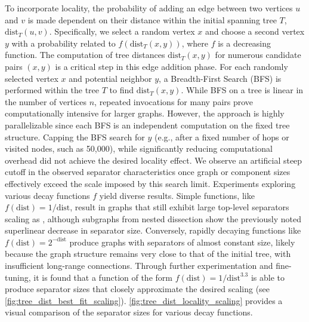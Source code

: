 To incorporate locality, the probability of adding an edge between two vertices \(u\) and \(v\) is made dependent on their distance within the initial spanning tree \(T\), \( \text{dist}_T(u, v) \).
Specifically, we select a random vertex \(x\) and choose a second vertex \(y\) with a probability related to \(f(\text{dist}_T(x, y))\), where \(f\) is a decreasing function.
The computation of tree distances \(\text{dist}_T(x, y)\) for numerous candidate pairs \((x,y)\) is a critical step in this edge addition phase.
For each randomly selected vertex \(x\) and potential neighbor \(y\), a Breadth-First Search (BFS) is performed within the tree \(T\) to find \(\text{dist}_T(x, y)\).
While BFS on a tree is linear in the number of vertices \(n\), repeated invocations for many pairs prove computationally intensive for larger graphs.
However, the approach is highly parallelizable since each BFS is an independent computation on the fixed tree structure.
Capping the BFS search for \(y\) (e.g., after a fixed number of hops or visited nodes, such as 50,000), while significantly reducing computational overhead did not achieve the desired locality effect.
We observe an artificial steep cutoff in the observed separator characteristics once graph or component sizes effectively exceed the scale imposed by this search limit.
Experiments exploring various decay functions \(f\) yield diverse results.
Simple functions, like \( f(\text{dist}) = 1/\text{dist}\), result in graphs that still exhibit large top-level separators scaling as , although subgraphs from nested dissection show the previously noted superlinear decrease in separator size.
Conversely, rapidly decaying functions like \( f(\text{dist}) = 2^{-\text{dist}} \) produce graphs with separators of almost constant size, likely because the graph structure remains very close to that of the initial tree, with insufficient long-range connections.
Through further experimentation and fine-tuning, it is found that a function of the form \( f(\text{dist}) = 1/\text{dist}^{3.3} \) is able to produce separator sizes that closely approximate the desired  scaling (see \cref{fig:tree_dist_best_fit_scaling}).
\cref{fig:tree_dist_locality_scaling} provides a visual comparison of the separator sizes for various decay functions.

